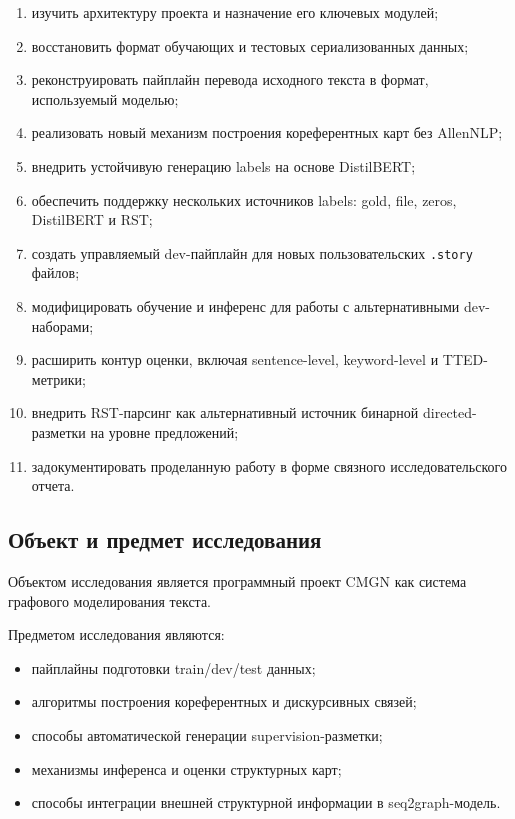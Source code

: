 \documentclass[12pt,a4paper]{article}
\begin{document}
\begin{enumerate}
    \item изучить архитектуру проекта и назначение его ключевых модулей;
    \item восстановить формат обучающих и тестовых сериализованных данных;
    \item реконструировать пайплайн перевода исходного текста в формат, используемый
    моделью;
    \item реализовать новый механизм построения кореферентных карт без AllenNLP;
    \item внедрить устойчивую генерацию labels на основе DistilBERT;
    \item обеспечить поддержку нескольких источников labels: gold, file, zeros,
    DistilBERT и RST;
    \item создать управляемый dev-пайплайн для новых пользовательских \texttt{.story}
    файлов;
    \item модифицировать обучение и инференс для работы с альтернативными dev-наборами;
    \item расширить контур оценки, включая sentence-level, keyword-level и TTED-метрики;
    \item внедрить RST-парсинг как альтернативный источник бинарной directed-разметки на
    уровне предложений;
    \item задокументировать проделанную работу в форме связного исследовательского отчета.
\end{enumerate}

\subsection{Объект и предмет исследования}

Объектом исследования является программный проект CMGN как система графового
моделирования текста.

Предметом исследования являются:

\begin{itemize}
    \item пайплайны подготовки train/dev/test данных;
    \item алгоритмы построения кореферентных и дискурсивных связей;
    \item способы автоматической генерации supervision-разметки;
    \item механизмы инференса и оценки структурных карт;
    \item способы интеграции внешней структурной информации в seq2graph-модель.
\end{itemize}
\end{document}
